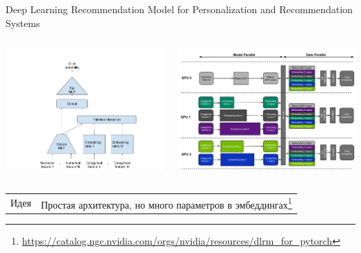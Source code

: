 \documentclass[11pt,aspectratio=169,handout]{beamer}
\begin{document}
\begin{frame}{Deep Learning Recommendation Model for Personalization and Recommendation Systems \cite{naumov2019deep}}

\begin{columns}
\begin{column}{0.5\textwidth} 
\begin{center}
\includegraphics[scale=0.2]{images/dlrm-arch.png}
\end{center}
\end{column}
\begin{column}{0.5\textwidth}
\begin{center}
\includegraphics[scale=0.1]{images/dlrm-parallel.png}
\end{center}
\end{column}
\end{columns}

\vfill
\begin{small}
\begin{tabular}{l l}
Идея & Простая архитектура, но много параметров в эмбеддингах\footnote{\url{https://catalog.ngc.nvidia.com/orgs/nvidia/resources/dlrm_for_pytorch}}
\end{tabular}
\end{small}

\end{frame}
\end{document}
